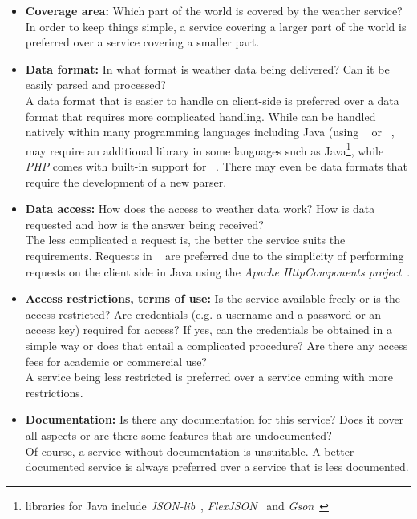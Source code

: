 \begin{itemize}
  \item \textbf{Coverage area:} Which part of the world is covered by the weather service?\\
  In order to keep things simple, a service covering a larger part of the world is preferred over a service covering a smaller part.
  
  \item \textbf{Data format:} In what format is weather data being delivered? Can it be easily parsed and processed?\\
  A data format that is easier to handle on client-side is preferred over a data format that requires more complicated handling. While \cite{XML} can be handled natively within many programming languages including Java (using ~\cite{DOM} or ~\cite{SAX}, ~\cite{rfc4627} may require an additional library in some languages such as Java\footnote{ libraries for Java include \emph{JSON-lib}~\cite{json-lib}, \emph{FlexJSON}~\cite{flexjson} and \emph{Gson}~\cite{gson}}, while \emph{PHP} comes with built-in support for ~\cite{php-json}. There may even be data formats that require the development of a new parser.
  
  \item \textbf{Data access:} How does the access to weather data work? How is data requested and how is the answer being received?\\
  The less complicated a request is, the better the service suits the requirements. Requests in ~\cite{rfc2616} are preferred due to the simplicity of performing requests on the client side in Java using the \emph{Apache HttpComponents project}~\cite{apache_hc}.
  
  \item \textbf{Access restrictions, terms of use:} Is the service available freely or is the access restricted? Are credentials (e.g. a username and a password or an access key) required for access? If yes, can the credentials be obtained in a simple way or does that entail a complicated procedure? Are there any access fees for academic or commercial use?\\
  A service being less restricted is preferred over a service coming with more restrictions.
  
  \item \textbf{Documentation:} Is there any documentation for this service? Does it cover all aspects or are there some features that are undocumented?\\
  Of course, a service without documentation is unsuitable. A better documented service is always preferred over a service that is less documented.
  

\end{itemize}

